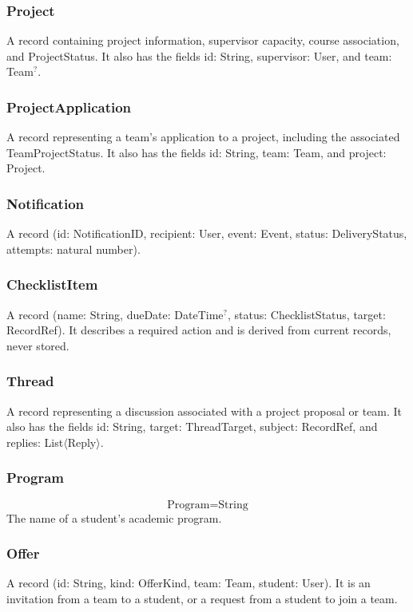 \documentclass[12pt, titlepage]{article}
\begin{document}
\subsubsection{Project}
A record containing project information, supervisor capacity, course association, and ProjectStatus.
It also has the fields id: String, supervisor: User, and team: Team$^{?}$.

\subsubsection{ProjectApplication}
A record representing a team's application to a project, including the associated TeamProjectStatus.
It also has the fields id: String, team: Team, and project: Project.

\subsubsection{Notification}
A record (id: NotificationID, recipient: User, event: Event, status: DeliveryStatus, attempts: natural number).

\subsubsection{ChecklistItem}
A record (name: String, dueDate: DateTime$^{?}$, status: ChecklistStatus, target: RecordRef).
It describes a required action and is derived from current records, never stored.

\subsubsection{Thread}
A record representing a discussion associated with a project proposal or team.
It also has the fields id: String, target: ThreadTarget, subject: RecordRef, and replies: List$\langle$Reply$\rangle$.

\subsubsection{Program}
\[
\text{Program} = \text{String}
\]
The name of a student's academic program.

\subsubsection{Offer}
A record (id: String, kind: OfferKind, team: Team, student: User).
It is an invitation from a team to a student, or a request from a student to join a team.
\end{document}
